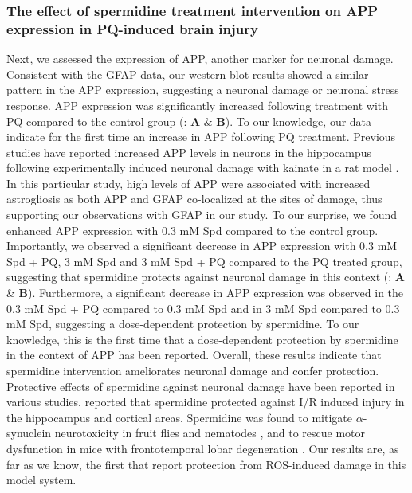 \subsubsection{The effect of spermidine treatment intervention on APP expression in PQ-induced brain injury}
Next, we assessed the expression of APP, another marker for neuronal damage. Consistent with the GFAP data, our western blot results showed a similar pattern in the APP expression, suggesting a neuronal damage or neuronal stress response. APP expression was significantly increased following treatment with PQ compared to the control group (: \textbf{A} \& \textbf{B}). To our knowledge, our data indicate for the first time an increase in APP following PQ treatment. Previous studies have reported increased APP levels in neurons in the hippocampus following experimentally induced neuronal damage with kainate in a rat model \citep{Siman1989}. In this particular study, high levels of APP were associated with increased astrogliosis as both APP and GFAP co-localized at the sites of damage, thus supporting our observations with GFAP in our study. To our surprise, we found enhanced APP expression with 0.3 mM Spd compared to the control group. Importantly, we observed a significant decrease in APP expression with 0.3 mM Spd + PQ, 3 mM Spd and 3 mM Spd + PQ compared to the PQ treated group, suggesting that spermidine protects against neuronal damage in this context (: \textbf{A} \& \textbf{B}). Furthermore, a significant decrease in APP expression was observed in the 0.3 mM Spd + PQ compared to 0.3 mM Spd and in 3 mM Spd compared to 0.3 mM Spd, suggesting a dose-dependent protection by spermidine. To our knowledge, this is the first time that a dose-dependent protection by spermidine in the context of APP has been reported. Overall, these results indicate that spermidine intervention ameliorates neuronal damage and confer protection. Protective effects of spermidine against neuronal damage have been reported in various studies. \citet{Yang2017} reported that spermidine protected against I/R induced injury in the hippocampus and cortical areas. Spermidine was found to mitigate $\alpha$-synuclein neurotoxicity in fruit flies and nematodes \citep{Buttner2014}, and to rescue motor dysfunction in mice with frontotemporal lobar degeneration \citep{Wang2012}. Our results are, as far as we know, the first that report protection from ROS-induced damage in this model system.

